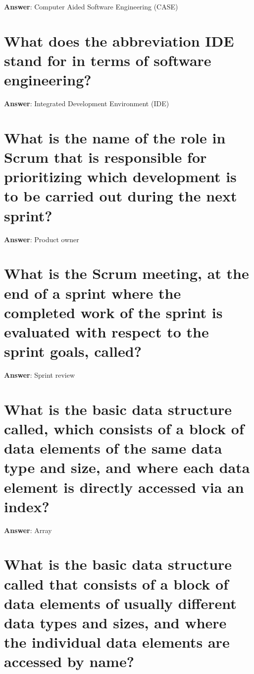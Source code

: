 \documentclass[a4paper,11pt,oneside]{book}
\begin{document}
\begin{sloppypar}
\label{q:47:sa:en:True}

\textbf{Answer}: Computer Aided Software Engineering (CASE)



\section{What does the abbreviation IDE stand for in terms of software engineering?}

\label{q:48:sa:en:True}

\textbf{Answer}: Integrated Development Environment (IDE)



\section{What is the name of the role in Scrum that is responsible for prioritizing which development is to be carried out during the next sprint?}

\label{q:49:sa:en:True}

\textbf{Answer}: Product owner



\section{What is the Scrum meeting, at the end of a sprint where the completed work of the sprint is evaluated with respect to the sprint goals, called?}

\label{q:50:sa:en:True}

\textbf{Answer}: Sprint review



\section{What is the basic data structure called, which consists of a block of data elements of the same data type and size, and where each data element is directly accessed via an index?}

\label{q:51:sa:en:True}

\textbf{Answer}: Array



\section{What is the basic data structure called that consists of a block of data elements of usually different data types and sizes, and where the individual data elements are accessed by name?}


\end{sloppypar}
\end{document}
